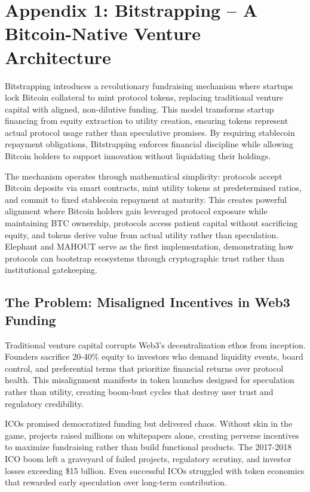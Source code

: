 \chapter{Appendix 1: Bitstrapping – A Bitcoin-Native Venture Architecture}

Bitstrapping introduces a revolutionary fundraising mechanism where startups lock Bitcoin collateral to mint protocol tokens, replacing traditional venture capital with aligned, non-dilutive funding. This model transforms startup financing from equity extraction to utility creation, ensuring tokens represent actual protocol usage rather than speculative promises. By requiring stablecoin repayment obligations, Bitstrapping enforces financial discipline while allowing Bitcoin holders to support innovation without liquidating their holdings.

The mechanism operates through mathematical simplicity: protocols accept Bitcoin deposits via smart contracts, mint utility tokens at predetermined ratios, and commit to fixed stablecoin repayment at maturity. This creates powerful alignment where Bitcoin holders gain leveraged protocol exposure while maintaining BTC ownership, protocols access patient capital without sacrificing equity, and tokens derive value from actual utility rather than speculation. Elephant and MAHOUT serve as the first implementation, demonstrating how protocols can bootstrap ecosystems through cryptographic trust rather than institutional gatekeeping.

\section{The Problem: Misaligned Incentives in Web3 Funding}

Traditional venture capital corrupts Web3's decentralization ethos from inception. Founders sacrifice 20-40\% equity to investors who demand liquidity events, board control, and preferential terms that prioritize financial returns over protocol health. This misalignment manifests in token launches designed for speculation rather than utility, creating boom-bust cycles that destroy user trust and regulatory credibility.

ICOs promised democratized funding but delivered chaos. Without skin in the game, projects raised millions on whitepapers alone, creating perverse incentives to maximize fundraising rather than build functional products. The 2017-2018 ICO boom left a graveyard of failed projects, regulatory scrutiny, and investor losses exceeding \$15 billion. Even successful ICOs struggled with token economics that rewarded early speculation over long-term contribution.

